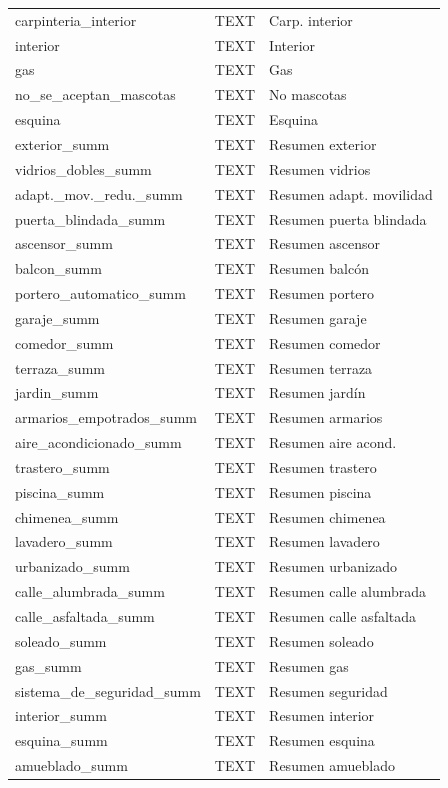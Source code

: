 \begin{longtable}{lll}
carpinteria\_interior & TEXT & Carp. interior \\
interior & TEXT & Interior \\
gas & TEXT & Gas \\
no\_se\_aceptan\_mascotas & TEXT & No mascotas \\
esquina & TEXT & Esquina \\
exterior\_summ & TEXT & Resumen exterior \\
vidrios\_dobles\_summ & TEXT & Resumen vidrios \\
adapt.\_mov.\_redu.\_summ & TEXT & Resumen adapt. movilidad \\
puerta\_blindada\_summ & TEXT & Resumen puerta blindada \\
ascensor\_summ & TEXT & Resumen ascensor \\
balcon\_summ & TEXT & Resumen balcón \\
portero\_automatico\_summ & TEXT & Resumen portero \\
garaje\_summ & TEXT & Resumen garaje \\
comedor\_summ & TEXT & Resumen comedor \\
terraza\_summ & TEXT & Resumen terraza \\
jardin\_summ & TEXT & Resumen jardín \\
armarios\_empotrados\_summ & TEXT & Resumen armarios \\
aire\_acondicionado\_summ & TEXT & Resumen aire acond. \\
trastero\_summ & TEXT & Resumen trastero \\
piscina\_summ & TEXT & Resumen piscina \\
chimenea\_summ & TEXT & Resumen chimenea \\
lavadero\_summ & TEXT & Resumen lavadero \\
urbanizado\_summ & TEXT & Resumen urbanizado \\
calle\_alumbrada\_summ & TEXT & Resumen calle alumbrada \\
calle\_asfaltada\_summ & TEXT & Resumen calle asfaltada \\
soleado\_summ & TEXT & Resumen soleado \\
gas\_summ & TEXT & Resumen gas \\
sistema\_de\_seguridad\_summ & TEXT & Resumen seguridad \\
interior\_summ & TEXT & Resumen interior \\
esquina\_summ & TEXT & Resumen esquina \\
amueblado\_summ & TEXT & Resumen amueblado \\

\end{longtable}
